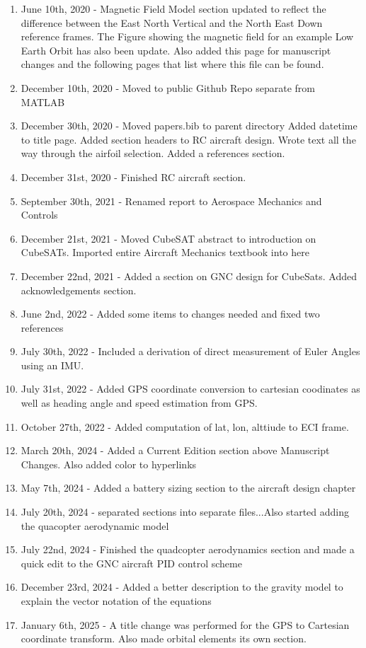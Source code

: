 \begin{enumerate}[itemsep=-5pt]
\item June 10th, 2020 - Magnetic Field Model section updated to
  reflect the difference between the East North Vertical and the North
  East Down reference frames. The Figure showing the magnetic field
  for an example Low Earth Orbit has also been update. Also added this
  page for manuscript changes and the following pages that list where
  this file can be found.
\item December 10th, 2020 - Moved to public Github Repo separate from
  MATLAB
\item December 30th, 2020 - Moved papers.bib to parent directory Added
  datetime to title page. Added  section headers to RC aircraft
  design. Wrote text all the way through the airfoil selection. Added
  a references section.
\item December 31st, 2020 - Finished RC aircraft section.
\item September 30th, 2021 - Renamed report to Aerospace Mechanics and
  Controls
\item December 21st, 2021 - Moved CubeSAT abstract to introduction on
  CubeSATs. Imported entire Aircraft Mechanics textbook into here
\item December 22nd, 2021 - Added a section on GNC design for
  CubeSats. Added acknowledgements section.
\item June 2nd, 2022 - Added some items to changes needed and fixed
  two references
\item July 30th, 2022 - Included a derivation of direct measurement of Euler Angles using an IMU.
\item July 31st, 2022 - Added GPS coordinate conversion to cartesian coodinates as well as heading angle and speed estimation from GPS.
\item October 27th, 2022 - Added computation of lat, lon, alttiude to ECI frame.
\item March 20th, 2024 - Added a Current Edition section above
  Manuscript Changes. Also added color to hyperlinks
\item May 7th, 2024 - Added a battery sizing section to the aircraft
  design chapter
\item July 20th, 2024 - separated sections into separate files...Also started adding the quacopter aerodynamic model
\item July 22nd, 2024 - Finished the quadcopter aerodynamics section and made a quick edit to the GNC aircraft PID control scheme
\item December 23rd, 2024 - Added a better description to the gravity model to explain the vector notation of the equations
\item January 6th, 2025 - A title change was performed for the GPS to Cartesian coordinate transform. Also made orbital elements its own section.
\end{enumerate}

